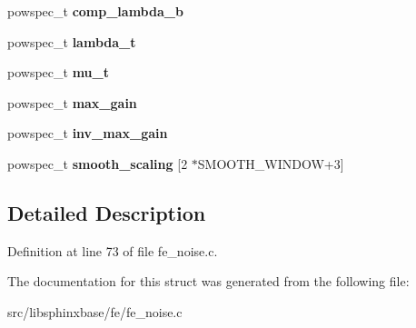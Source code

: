 \begin{DoxyCompactItemize}
\item 
powspec\+\_\+t {\bfseries comp\+\_\+lambda\+\_\+b}\label{structnoise__stats__s_ac3317afbf629cadc04b41c5657f0140d}

\item 
powspec\+\_\+t {\bfseries lambda\+\_\+t}\label{structnoise__stats__s_a94d5961c9df8d3345821c2f6c4358514}

\item 
powspec\+\_\+t {\bfseries mu\+\_\+t}\label{structnoise__stats__s_ad5cc76a830669ea5fbf0b8f4e4f80652}

\item 
powspec\+\_\+t {\bfseries max\+\_\+gain}\label{structnoise__stats__s_afeda1bf01ce753f6b3e4fb89279cfc63}

\item 
powspec\+\_\+t {\bfseries inv\+\_\+max\+\_\+gain}\label{structnoise__stats__s_ab6b62f1324e05bafa461bdcab8bc1bf3}

\item 
powspec\+\_\+t {\bfseries smooth\+\_\+scaling} [2 $\ast$S\+M\+O\+O\+T\+H\+\_\+\+W\+I\+N\+D\+O\+W+3]\label{structnoise__stats__s_a4bc8cd91479f20703fdf82251ba90e6e}

\end{DoxyCompactItemize}


\subsection{Detailed Description}


Definition at line 73 of file fe\+\_\+noise.\+c.



The documentation for this struct was generated from the following file\+:\begin{DoxyCompactItemize}
\item 
src/libsphinxbase/fe/fe\+\_\+noise.\+c\end{DoxyCompactItemize}
